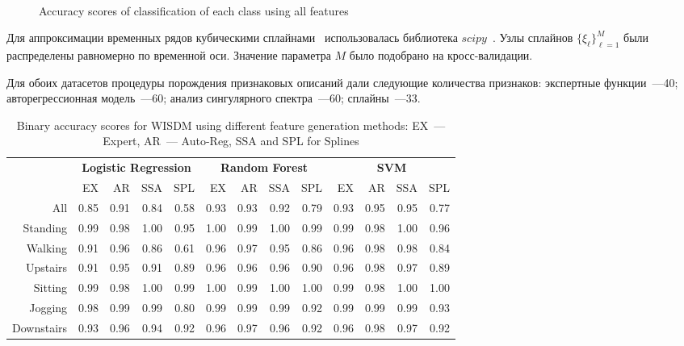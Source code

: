 \documentclass{llncs}
\begin{document}
\begin{figure}[!h]
	\\
	\caption{Accuracy scores of classification of each class using all features}
	\label{fig::feature_union_results}
\end{figure}

Для аппроксимации временных рядов кубическими сплайнами~\cite{deboor1978splines} использовалась библиотека $scipy$~\cite{scipy}. 
Узлы сплайнов $\{\xi_{\ell}\}_{\ell = 1}^M$ были распределены равномерно по временной оси.
Значение параметра $M$ было подобрано на кросс-валидации.

Для обоих датасетов процедуры порождения признаковых описаний дали следующие количества признаков: экспертные функции~---40; авторегрессионная модель~---60; анализ сингулярного спектра~---60; сплайны~---33.

\begin{table}[!h]
	\centering
	\caption{Binary accuracy scores for WISDM using different feature generation methods: EX~--- Expert, AR~--- Auto-Reg, SSA and  SPL for Splines}
	\footnotesize
	\begin{tabular}{r|rrrr|rrrr|rrrr|}
		& \multicolumn{4}{c|}{\textbf{Logistic Regression}} & \multicolumn{4}{c|}{\textbf{Random Forest}} & \multicolumn{4}{c|}{\textbf{SVM}}          \\ \cline{2-13} 
		& EX   & AR   & SSA   & SPL  & EX  & AR & SSA & SPL & EX & AR & SSA & SPL \\ \hline
		All& 0.85 & 0.91 & 0.84 & 0.58 & 0.93 & 0.93 & 0.92 & 0.79 & 0.93 & 0.95 & 0.95 & 0.77 \\
		Standing& 0.99 & 0.98 & 1.00 & 0.95 & 1.00 & 0.99 & 1.00 & 0.99 & 0.99 & 0.98 & 1.00 & 0.96 \\
		Walking& 0.91 & 0.96 & 0.86 & 0.61 & 0.96 & 0.97 & 0.95 & 0.86 & 0.96 & 0.98 & 0.98 & 0.84 \\
		Upstairs& 0.91 & 0.95 & 0.91 & 0.89 & 0.96 & 0.96 & 0.96 & 0.90 & 0.96 & 0.98 & 0.97 & 0.89 \\
		Sitting& 0.99 & 0.98 & 1.00 & 0.99 & 1.00 & 0.99 & 1.00 & 1.00 & 0.99 & 0.98 & 1.00 & 1.00 \\
		Jogging& 0.98 & 0.99 & 0.99 & 0.80 & 0.99 & 0.99 & 0.99 & 0.92 & 0.99 & 0.99 & 0.99 & 0.93 \\
		Downstairs& 0.93 & 0.96 & 0.94 & 0.92 & 0.96 & 0.97 & 0.96 & 0.92 & 0.96 & 0.98 & 0.97 & 0.92 \\ \hline
	\end{tabular}
	\label{tbl::wisdm_methods_results}
\end{table}
\end{document}
